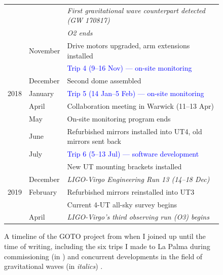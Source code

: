 \begin{colsection}
\begin{colsection}
\begin{figure}[p]
\begin{center}
\begin{tabular}{cl|@{\tls}l}
                 &           & \textit{First gravitational wave counterpart detected (GW 170817)} \\
                 &           & \textit{O2 ends} \\
                 & November  & Drive motors upgraded, arm extensions installed \\
                 &           & \textcolor{Blue}{Trip 4 (9--16 Nov) --- on-site monitoring} \\
                 & December  & Second dome assembled \\
            \midrule
            2018 & January   & \textcolor{Blue}{Trip 5 (14 Jan--5 Feb) --- on-site monitoring} \\
                 & April     & Collaboration meeting in Warwick (11--13 Apr)\\
                 & May       & On-site monitoring program ends \\
                 & June      & Refurbished mirrors installed into UT4, old mirrors sent back \\
                 & July      & \textcolor{Blue}{Trip 6 (5--13 Jul) --- software development} \\
                 &           & New UT mounting brackets installed \\
                 & December  & \textit{LIGO-Virgo Engineering Run 13 (14--18 Dec)} \\
            \midrule
            2019 & February  & Refurbished mirrors reinstalled into UT3 \\
                 &           & Current 4-UT all-sky survey begins \\
                 & April     & \textit{LIGO-Virgo's third observing run (O3) begins} \\
        \end{tabular}
    \end{center}
    \caption[Timeline of the GOTO project]{
        A timeline of the GOTO project from when I joined up until the time of writing, including the six trips I made to La Palma during commissioning (in ) and concurrent developments in the field of gravitational waves (in \textit{italics}) .
    }\label{tab:timeline}
\end{figure}

\clearpage


\end{colsection}
\end{colsection}
